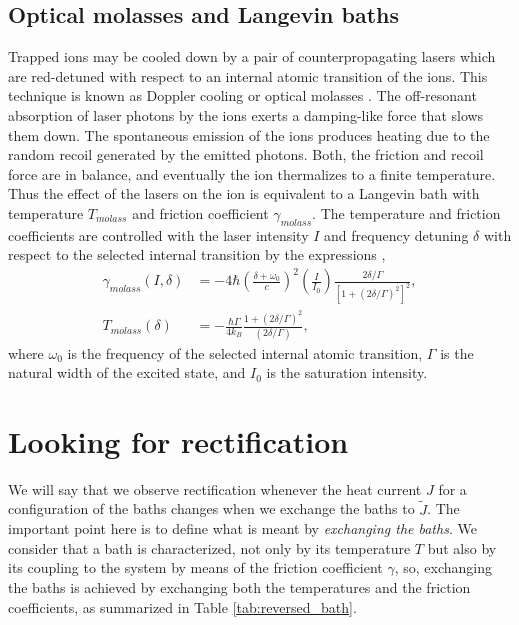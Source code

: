 \subsection{Optical molasses and Langevin baths}

Trapped ions may be cooled down by a pair of counterpropagating lasers which are red-detuned with respect to an internal atomic transition of the ions. This technique is known as Doppler cooling or optical molasses \cite{Chu1985,Cohen1992,Metcalf1999,Metcalf2003}. The off-resonant absorption of laser photons by the ions exerts a damping-like force that slows them down. The spontaneous emission of the ions produces heating due to the random recoil generated by the emitted photons. Both, the friction and recoil force are in balance, and eventually the ion thermalizes to a finite temperature.
Thus the effect of the lasers on the ion is equivalent to a Langevin bath with temperature $T_{molass}$ and friction coefficient $\gamma_{molass}$. The temperature and friction coefficients are controlled with the laser intensity $I$ and frequency detuning $\delta$ with respect to the selected internal transition by the expressions \cite{Cohen1992,Metcalf2003,Ruiz2014},
%
\begin{align}
  \gamma_{molass}(I,\delta) &= -4 \hbar \left(\frac{\delta + \omega_0}{c}\right)^2 \left(\frac{I}{I_0}\right)\frac{2\delta/\Gamma}{\left[1 + (2\delta/\Gamma)^2\right]^2},\nonumber\\
  T_{molass}(\delta) &= -\frac{\hbar \Gamma}{4 k_B} \frac{1+(2\delta/\Gamma)^2}{(2\delta/\Gamma)},
  \label{eq:DopplerCoolingToyModel}
\end{align}
%
where $\omega_0$ is the frequency of the selected internal atomic transition, $\Gamma$ is the natural width of the excited state, and $I_0$ is the saturation intensity.
%
%
%
\section{Looking for rectification\label{sec:lookingForR}}
%
%
%
We will say that we observe rectification whenever the heat current $J$ for a configuration of the baths changes when we exchange the baths to $\tilde{J}$. The important point here is to define what is  meant by \textit{exchanging the baths}. We consider that a bath is characterized, not only by its temperature $T$ but also by its coupling  to the system by means of the friction coefficient $\gamma$, so, exchanging the baths is achieved by exchanging both the temperatures and the friction coefficients, as summarized in Table \ref{tab:reversed_bath}.

